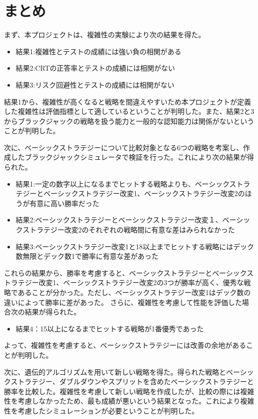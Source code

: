 \section{まとめ}
まず、本プロジェクトは、複雑性の実験により次の結果を得た。
\begin{itemize}
    \item 結果1:複雑性とテストの成績には強い負の相関がある
    \item 結果2:CRTの正答率とテストの成績には相関がない
    \item 結果3:リスク回避性とテストの成績には相関がない
\end{itemize}

結果1から、複雑性が高くなると戦略を間違えやすいため本プロジェクトが定義した複雑性は評価指標として適しているということが判明した。また、結果2と3からブラックジャックの戦略を扱う能力と一般的な認知能力は関係がないということが判明した。

次に、ベーシックストラテジーについて比較対象となる6つの戦略を考案し、作成したブラックジャックシミュレータで検証を行った。これにより次の結果が得られた。
\begin{itemize}
\item 結果1:一定の数字以上になるまでヒットする戦略よりも、ベーシックストラテジーとベーシックストラテジー改変1、ベーシックストラテジー改変2のほうが有意に高い勝率だった
\item 結果2:ベーシックストラテジーとベーシックストラテジー改変１、ベーシックストラテジー改変2のそれぞれの戦略間に有意な差はみられなかった
\item 結果3:ベーシックストラテジー改変1と18以上までヒットする戦略にはデック数無限とデック数1で勝率に有意な差があった
\end{itemize}

これらの結果から、勝率を考慮すると、ベーシックストラテジーとベーシックストラテジー改変1、ベーシックストラテジー改変2の3つが勝率が高く、優秀な戦略であることが分かった。ただし、ベーシックストラテジー改変1はデック数の違いによって勝率に差があった。
さらに、複雑性を考慮して性能を評価した場合次の結果が得られた。
\begin{itemize}
\item 結果4：15以上になるまでヒットする戦略が1番優秀であった
\end{itemize}

よって、複雑性を考慮すると、ベーシックストラテジーには改善の余地があることが判明した。

次に、遺伝的アルゴリズムを用いて新しい戦略を得た。得られた戦略とベーシックストラテジー、ダブルダウンやスプリットを含めたベーシックストラテジーと勝率を比較した。複雑性を考慮して新しい戦略を作成したが、比較の際には複雑性を考慮しなかったため、最も成績が悪いという結果となった。これにより複雑性を考慮したシミュレーションが必要ということが判明した。

